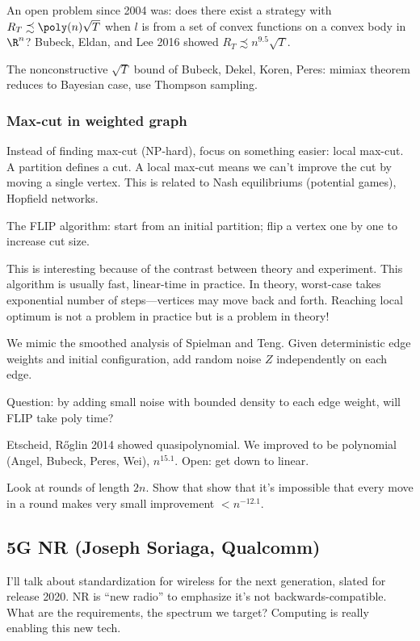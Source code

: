 An open problem since 2004 was: does there exist a strategy with $R_T\precsim \poly(n)\sqrt T$ when $l$ is from a set of convex functions on a convex body in $\R^n$? Bubeck, Eldan, and Lee 2016 showed $R_T\precsim n^{9.5}\sqrt T$.

The nonconstructive $\sqrt T$ bound of Bubeck, Dekel, Koren, Peres: mimiax theorem reduces to Bayesian case, use Thompson sampling. 

\subsubsection{Max-cut in weighted graph}

Instead of finding max-cut (NP-hard), focus on something easier: local max-cut.
A partition defines a cut. A local max-cut means we can't improve the cut by moving a single vertex. This is related to Nash equilibriums (potential games), Hopfield networks.

The FLIP algorithm: start from an initial partition; flip a vertex one by one to increase cut size.

This is interesting because of the contrast between theory and experiment. This algorithm is usually fast, linear-time in practice. In theory, worst-case takes exponential number of steps---vertices may move back and forth.
Reaching local optimum is not a problem in practice but is a problem in theory!

We mimic the smoothed analysis of Spielman and Teng. Given deterministic edge weights and initial configuration, add random noise $Z$ independently on each edge.

Question: by adding small noise with bounded density to each edge weight, will FLIP take poly time?

Etscheid, R\H oglin 2014 showed quasipolynomial. We improved to be polynomial (Angel, Bubeck, Peres, Wei), $n^{15.1}$. Open: get down to linear.

Look at rounds of length $2n$. Show that show that it's impossible that every move in a round makes very small improvement $<n^{-12.1}$.


\subsection{5G NR (Joseph Soriaga, Qualcomm)}

I'll talk about standardization for wireless for the next generation, slated for release 2020.
NR is ``new radio'' to emphasize it's not backwards-compatible. What are the requirements, the spectrum we target?
Computing is really enabling this new tech.


